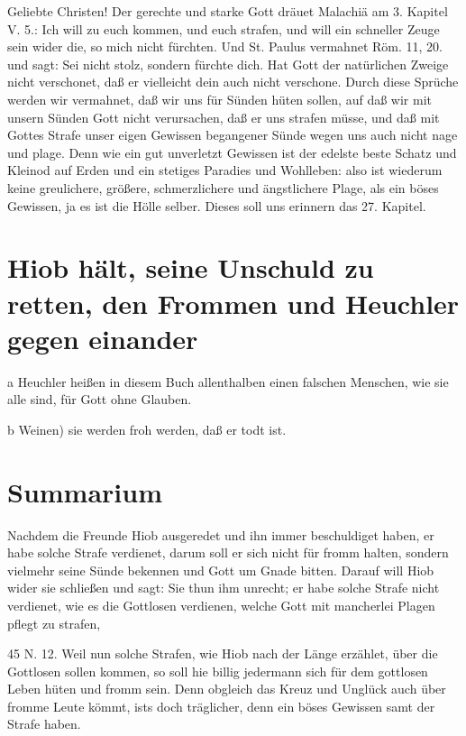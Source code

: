 Geliebte Christen! Der gerechte und starke Gott dräuet Malachiä am 3. Kapitel V. 5.: Ich will zu euch kommen, und euch strafen, und will ein schneller Zeuge sein wider die, so mich nicht fürchten. Und St. Paulus vermahnet Röm. 11, 20. und sagt: Sei nicht stolz, sondern fürchte dich. Hat Gott der natürlichen Zweige nicht verschonet, daß er vielleicht dein auch nicht verschone. Durch diese Sprüche werden wir vermahnet, daß wir uns für Sünden hüten sollen, auf daß wir mit unsern Sünden Gott nicht verursachen, daß er uns strafen müsse, und daß mit Gottes Strafe unser eigen Gewissen begangener Sünde wegen uns auch nicht nage und plage. Denn wie ein gut unverletzt Gewissen ist der edelste beste Schatz und Kleinod auf Erden und ein stetiges Paradies und Wohlleben: also ist wiederum keine greulichere, größere, schmerzlichere und ängstlichere Plage, als ein böses Gewissen, ja es ist die Hölle selber. Dieses soll uns erinnern das 27. Kapitel.

\section[Hiob hält, seine Unschuld zu retten, den Frommen]{Hiob hält, seine Unschuld zu retten, den Frommen und Heuchler gegen einander}

a Heuchler heißen in diesem Buch allenthalben einen falschen Menschen, wie sie alle sind, für Gott ohne Glauben.

b Weinen) sie werden froh werden, daß er todt ist.

\section{Summarium}

Nachdem die Freunde Hiob ausgeredet und ihn immer beschuldiget haben, er habe solche Strafe verdienet, darum soll er sich nicht für fromm halten, sondern vielmehr seine Sünde bekennen und Gott um Gnade bitten. Darauf will Hiob wider sie schließen und sagt: Sie thun ihm unrecht; er habe solche Strafe nicht verdienet, wie es die Gottlosen verdienen, welche Gott mit mancherlei Plagen pflegt zu strafen,

45
N. 12. Weil nun solche Strafen, wie Hiob nach der Länge erzählet, über die Gottlosen sollen kommen, so soll hie billig jedermann sich für dem gottlosen Leben hüten und fromm sein. Denn obgleich das Kreuz und Unglück auch über fromme Leute kömmt, ists doch träglicher, denn ein böses Gewissen samt der Strafe haben.

